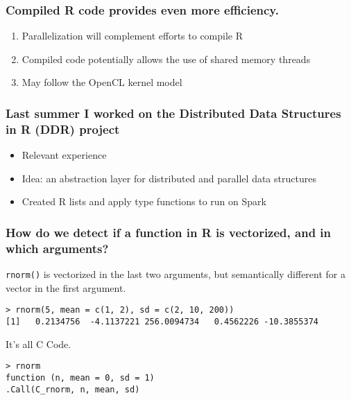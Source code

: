 \documentclass{beamer}
\begin{document}
\begin{frame}

    \frametitle{Compiled R code provides even more efficiency.}

\begin{enumerate}
    \item Parallelization will complement efforts to compile R
    \item Compiled code potentially allows the use of shared memory threads
    \item May follow the OpenCL kernel model
\end{enumerate}


\end{frame}
\begin{frame}

    \frametitle{Last summer I worked on the Distributed Data Structures in
R (DDR) project}


\begin{itemize}
    \item Relevant experience
    \item Idea: an abstraction layer for distributed and parallel data structures
    \item Created R lists and apply type functions to run on Spark
\end{itemize}

\end{frame}
\begin{frame}[fragile]

    \frametitle{How do we detect if a function in R is vectorized, and in
    which arguments?}

    \texttt{rnorm()} is vectorized in the last two arguments, but
    semantically different for a vector in the first argument.

\begin{verbatim}
> rnorm(5, mean = c(1, 2), sd = c(2, 10, 200))
[1]   0.2134756  -4.1137221 256.0094734   0.4562226 -10.3855374
\end{verbatim}

It's all C Code.

\begin{verbatim}
> rnorm
function (n, mean = 0, sd = 1)
.Call(C_rnorm, n, mean, sd)
\end{verbatim}

\end{frame}
\end{document}
